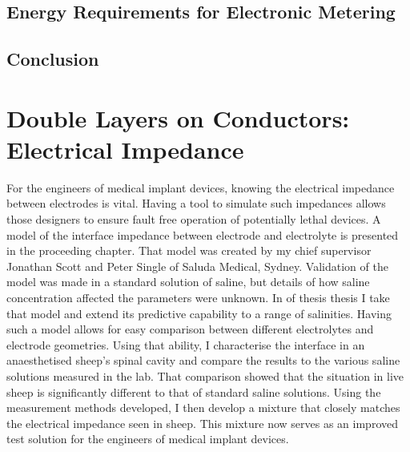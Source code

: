 
   \chapter{Energy Requirements for Electronic Metering}
     \label{chap:part1_energyHarvestingRequirements}
     


   \chapter{Conclusion}
     \label{chap:part1_conclusion}
     




\part{Double Layers on Conductors: Electrical Impedance}
  \label{part:doubleLayersOnConductors}

  For the engineers of medical implant devices, knowing the electrical impedance between electrodes is vital.
  Having a tool to simulate such impedances allows those designers to ensure fault free operation of potentially lethal devices.
  A model of the interface impedance between electrode and electrolyte is presented in the proceeding chapter.
  That model was created by my chief supervisor Jonathan Scott and Peter Single of Saluda Medical, Sydney.
  Validation of the model was made in a standard solution of saline, but details of how saline concentration affected the parameters were unknown.
  In \cref{part:doubleLayersOnConductors} of thesis thesis I take that model and extend its predictive capability to a range of salinities.
  Having such a model allows for easy comparison between different electrolytes and electrode geometries.
  Using that ability, I characterise the interface in an anaesthetised sheep's spinal cavity and compare the results to the various saline solutions measured in the lab.
  That comparison showed that the situation in live sheep is significantly different to that of standard saline solutions.
  Using the measurement methods developed, I then develop a mixture that closely matches the electrical impedance seen in sheep.
  This mixture now serves as an improved test solution for the engineers of medical implant devices.

